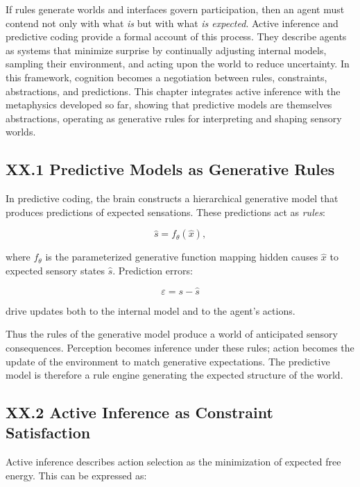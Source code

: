 \documentclass[12pt,letterpaper]{article}
\begin{document}
If rules generate worlds and interfaces govern participation, then an agent must contend not only with what \emph{is} but with what \emph{is expected}. Active inference and predictive coding provide a formal account of this process. They describe agents as systems that minimize surprise by continually adjusting internal models, sampling their environment, and acting upon the world to reduce uncertainty. In this framework, cognition becomes a negotiation between rules, constraints, abstractions, and predictions.  
This chapter integrates active inference with the metaphysics developed so far, showing that predictive models are themselves abstractions, operating as generative rules for interpreting and shaping sensory worlds.

\subsection{XX.1 Predictive Models as Generative Rules}

In predictive coding, the brain constructs a hierarchical generative model that produces predictions of expected sensations. These predictions act as \emph{rules}:

\[
\hat{s} = f_\theta(\hat{x}),
\]

where \(f_\theta\) is the parameterized generative function mapping hidden causes \(\hat{x}\) to expected sensory states \(\hat{s}\).  
Prediction errors:

\[
\varepsilon = s - \hat{s}
\]

drive updates both to the internal model and to the agent’s actions.

Thus the rules of the generative model produce a world of anticipated sensory consequences. Perception becomes inference under these rules; action becomes the update of the environment to match generative expectations. The predictive model is therefore a rule engine generating the expected structure of the world.

\subsection{XX.2 Active Inference as Constraint Satisfaction}

Active inference describes action selection as the minimization of expected free energy. This can be expressed as:
\end{document}
